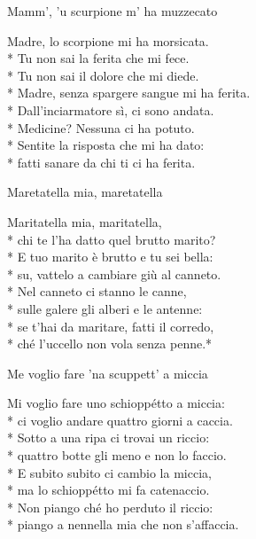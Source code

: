 \documentclass[11pt]{book}
\begin{document}
\begin{poem}{Mamm’, ’u scurpione m’ ha muzzecato}{}
\settowidth{\versewidth}{Madre, senza spargere sangue mi ha ferita}
\begin{altverse}
Madre, lo scorpione mi ha morsicata.\\*
Tu non sai la ferita che mi fece.\\*
Tu non sai il dolore che mi diede.\\*
Madre, senza spargere sangue mi ha ferita.\\*
Dall’inciarmatore sì, ci sono andata.\\*
Medicine? Nessuna ci ha potuto.\\*
Sentite la risposta che mi ha dato:\\*
fatti sanare da chi ti ci ha ferita.
\end{altverse}
\end{poem}

\begin{poem}{Maretatella mia, maretatella}{}
\settowidth{\versewidth}{Se t’hai da maritare, fatti il corredo}
\begin{altverse}
Maritatella mia, maritatella,\\*
chi te l’ha datto quel brutto marito?\\*
E tuo marito è brutto e tu sei bella:\\*
su, vattelo a cambiare giù al canneto.\\*
Nel canneto ci stanno le canne,\\*
sulle galere gli alberi e le antenne:\\*
se t’hai da maritare, fatti il corredo,\\*
ché l’uccello non vola senza penne.*
\end{altverse}
\end{poem}

\begin{poem}{Me voglio fare ’na scuppett’ a miccia}{}
\settowidth{\versewidth}{Ci voglio andare quattro giorni a caccia}
\begin{altverse}
Mi voglio fare uno schioppétto a miccia:\\*
ci voglio andare quattro giorni a caccia.\\*
Sotto a una ripa ci trovai un riccio:\\*
quattro botte gli meno e non lo faccio.\\*
E subito subito ci cambio la miccia,\\*
ma lo schioppétto mi fa catenaccio.\\*
Non piango ché ho perduto il riccio:\\*
piango a nennella mia che non s’affaccia.
\end{altverse}
\end{poem}
\end{document}
